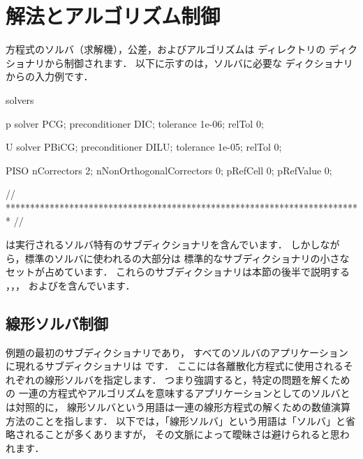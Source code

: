 \section{解法とアルゴリズム制御}
\label{sec:4.5}
方程式のソルバ（求解機），公差，およびアルゴリズムは
ディレクトリの
%
%
ディクショナリから制御されます．
以下に示すのは，ソルバに必要な
ディクショナリからの入力例です．
\begin{OFverbatim}[file, linenum=17]

solvers
{
    p
    {
        solver           PCG;
        preconditioner   DIC;
        tolerance        1e-06;
        relTol           0;
    }

    U
    {
        solver           PBiCG;
        preconditioner   DILU;
        tolerance        1e-05;
        relTol           0;
    }
}

PISO
{
    nCorrectors     2;
    nNonOrthogonalCorrectors 0;
    pRefCell        0;
    pRefValue       0;
}


// ************************************************************************* //
\end{OFverbatim}%
\label{p:U-117}%
は実行されるソルバ特有のサブディクショナリを含んでいます．
しかしながら，標準のソルバに使われるの大部分は
標準的なサブディクショナリの小さなセットが占めています．
これらのサブディクショナリは本節の後半で説明する
，，，
およびを含んでいます．


\subsection{線形ソルバ制御}
\label{ssec:4.5.1}
例題の最初のサブディクショナリであり，
すべてのソルバのアプリケーションに現れるサブディクショナリは
%
%
です．
ここには各離散化方程式に使用されるそれぞれの線形ソルバを指定します．
つまり強調すると，特定の問題を解くための
一連の方程式やアルゴリズムを意味するアプリケーションとしてのソルバとは対照的に，
線形ソルバという用語は一連の線形方程式の解くための数値演算方法のことを指します．
以下では，「線形ソルバ」という用語は「ソルバ」と省略されることが多くありますが，
その文脈によって曖昧さは避けられると思われます．

